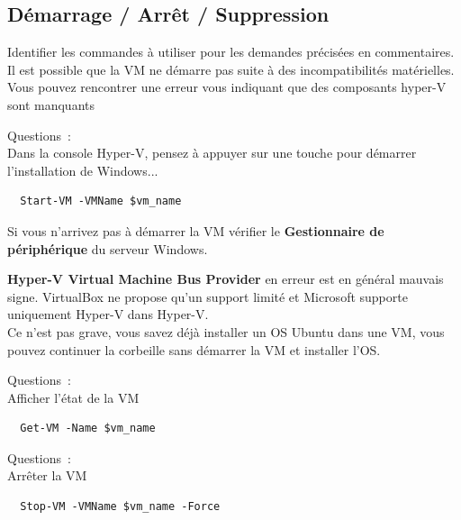 \subsection*{Démarrage / Arrêt / Suppression}
{}
\noindent Identifier les commandes à utiliser pour les demandes précisées en commentaires. \\
Il est possible que la VM ne démarre pas suite à des incompatibilités matérielles. \\
Vous pouvez rencontrer une erreur vous indiquant que des composants hyper-V sont manquants

\vspace{0.5cm}

Questions~: \\
Dans la console Hyper-V, pensez à appuyer sur une touche pour démarrer l'installation de Windows...

\begin{verbatim}
  Start-VM -VMName $vm_name
\end{verbatim}

\newpage

\noindent Si vous n'arrivez pas à démarrer la VM vérifier le \textbf{Gestionnaire de périphérique} du serveur Windows.

\noindent \textbf{Hyper-V Virtual Machine Bus Provider} en erreur est en général mauvais signe. VirtualBox ne propose qu'un support limité et Microsoft supporte uniquement Hyper-V dans Hyper-V. \\
Ce n'est pas grave, vous savez déjà installer un OS Ubuntu dans une VM, vous pouvez continuer la corbeille sans démarrer la VM et installer l'OS.

\vspace{0.5cm}

Questions~: \\
Afficher l'état de la VM

\begin{verbatim}
  Get-VM -Name $vm_name
\end{verbatim}

\vspace{0.5cm}

Questions~: \\
Arrêter la VM

\begin{verbatim}
  Stop-VM -VMName $vm_name -Force
\end{verbatim}

\vspace{0.5cm}

